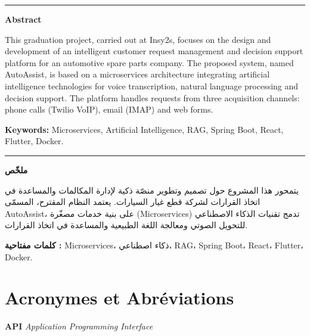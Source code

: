 \documentclass[a4paper,12pt]{report}
\begin{document}
\vspace{0.6cm}
\hrule
\vspace{0.6cm}

\noindent\textbf{Abstract}

\noindent This graduation project, carried out at Insy2s, focuses on the design and development of an intelligent customer request management and decision support platform for an automotive spare parts company. The proposed system, named AutoAssist, is based on a microservices architecture integrating artificial intelligence technologies for voice transcription, natural language processing and decision support. The platform handles requests from three acquisition channels: phone calls (Twilio VoIP), email (IMAP) and web forms.

\textbf{Keywords:} Microservices, Artificial Intelligence, RAG, Spring Boot, React, Flutter, Docker.

\vspace{0.6cm}
\hrule
\vspace{0.6cm}

\begin{Arabic}
\noindent\textbf{ملخّص}
\end{Arabic}

\begin{Arabic}
يتمحور هذا المشروع حول تصميم وتطوير منصّة ذكية لإدارة المكالمات والمساعدة في اتخاذ القرارات لشركة قطع غيار السيارات. يعتمد النظام المقترح، المسمّى AutoAssist، على بنية خدمات مصغّرة (Microservices) تدمج تقنيات الذكاء الاصطناعي للتحويل الصوتي ومعالجة اللغة الطبيعية والمساعدة في اتخاذ القرارات.
\end{Arabic}

\begin{Arabic}
\textbf{كلمات مفتاحية :} Microservices، ذكاء اصطناعي، RAG، Spring Boot، React، Flutter، Docker.
\end{Arabic}

\newpage
\tableofcontents
\newpage
\listoffigures
\newpage
\listoftables
\newpage

\chapter*{Acronymes et Abr\'{e}viations}

\noindent\textbf{API} \hspace{1.5cm} \textit{Application Programming Interface}
\end{document}
